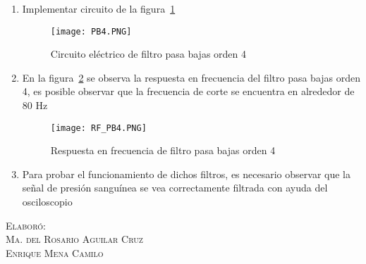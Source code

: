 \documentclass[10pt,letterpaper,spanish,twoside]{report}
\begin{document}
\begin{enumerate}
 \item Implementar circuito de la figura~\ref{contexto:PB4}
  \begin{figure}[H]
 	\centering
 	\texttt{[image: PB4.PNG]}
 	\caption{Circuito eléctrico de filtro pasa bajas orden 4}
	\label{contexto:PB4}
 \end{figure}
 \item En la figura~\ref{contexto:RF_4} se observa la respuesta en frecuencia del filtro pasa bajas orden 4, es posible observar que la frecuencia de corte se encuentra en alrededor de 80 Hz
 \begin{figure}[H]
 	\centering
 	\texttt{[image: RF\_PB4.PNG]}
 	\caption{Respuesta en frecuencia de filtro pasa bajas orden 4}
	\label{contexto:RF_4}
 \end{figure}
 \item Para probar el funcionamiento de dichos filtros, es necesario observar que la señal de presión sanguínea se vea correctamente filtrada con ayuda del osciloscopio
\end{enumerate}


\vfill
\begin{flushright}
\textsc{Elaboró:\\
Ma. del Rosario Aguilar Cruz\\
Enrique Mena Camilo}
\end{flushright}
\end{document}
